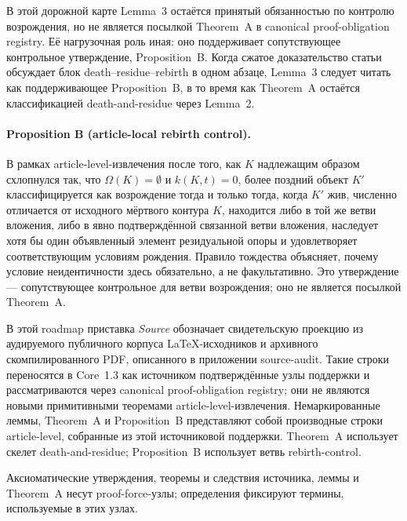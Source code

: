 В этой дорожной карте Lemma~3 остаётся принятый обязанностью по контролю возрождения, но не является посылкой Theorem~A в canonical proof-obligation registry. Её нагрузочная роль иная: оно поддерживает сопутствующее контрольное утверждение, Proposition~B. Когда сжатое доказательство статьи обсуждает блок death--residue--rebirth в одном абзаце, Lemma~3 следует читать как поддерживающее Proposition~B, в то время как Theorem~A остаётся классификацией death-and-residue через Lemma~2.

\paragraph{Proposition B (article-local rebirth control).}
\label{prop:oc13-rebirth-control}
В рамках article-level-извлечения после того, как \(K\) надлежащим образом схлопнулся так, что \(\Omega(K)=\emptyset\) и \(k(K,t)=0\), более поздний объект \(K'\) классифицируется как возрождение тогда и только тогда, когда \(K'\) жив, численно отличается от исходного мёртвого контура \(K\), находится либо в той же ветви вложения, либо в явно подтверждённой связанной ветви вложения, наследует хотя бы один объявленный элемент резидуальной опоры и удовлетворяет соответствующим условиям рождения. Правило тождества объясняет, почему условие неидентичности здесь обязательно, а не факультативно. Это утверждение — сопутствующее контрольное для ветви возрождения; оно не является посылкой Theorem~A.

В этой roadmap приставка \emph{Source} обозначает свидетельскую проекцию из аудируемого публичного корпуса LaTeX-исходников и архивного скомпилированного PDF, описанного в приложении source-audit. Такие строки переносятся в Core~1.3 как источником подтверждённые узлы поддержки и рассматриваются через canonical proof-obligation registry; они не являются новыми примитивными теоремами article-level-извлечения. Немаркированные леммы, Theorem~A и Proposition~B представляют собой производные строки article-level, собранные из этой источниковой поддержки. Theorem~A использует скелет death-and-residue; Proposition~B использует ветвь rebirth-control.

Аксиоматические утверждения, теоремы и следствия источника, леммы и Theorem~A несут proof-force-узлы; определения фиксируют термины, используемые в этих узлах.

